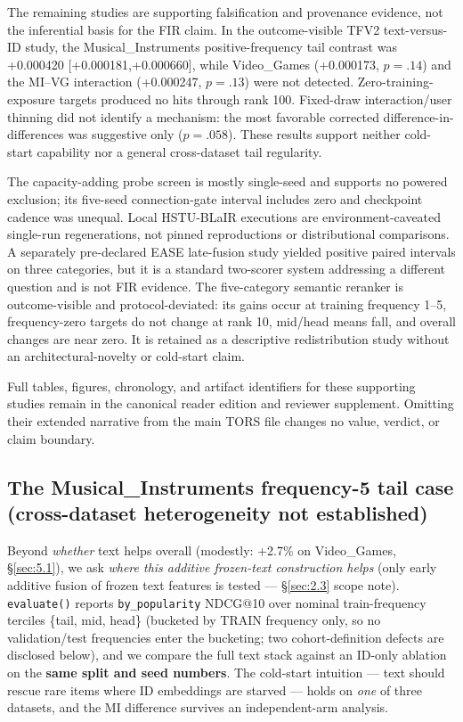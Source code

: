 The remaining studies are supporting falsification and provenance evidence, not the
inferential basis for the FIR claim.  In the outcome-visible TFV2 text-versus-ID
study, the Musical\_Instruments positive-frequency tail contrast was +0.000420
[+0.000181,+0.000660], while Video\_Games (+0.000173, $p=.14$) and the
MI--VG interaction (+0.000247, $p=.13$) were not detected.  Zero-training-exposure
targets produced no hits through rank 100.  Fixed-draw interaction/user thinning did
not identify a mechanism: the most favorable corrected difference-in-differences was
suggestive only ($p=.058$).  These results support neither cold-start capability nor a
general cross-dataset tail regularity.

The capacity-adding probe screen is mostly single-seed and supports no powered
exclusion; its five-seed connection-gate interval includes zero and checkpoint cadence
was unequal.  Local HSTU-BLaIR executions are environment-caveated single-run
regenerations, not pinned reproductions or distributional comparisons.  A separately
pre-declared EASE late-fusion study yielded positive paired intervals on three
categories, but it is a standard two-scorer system addressing a different question and
is not FIR evidence.  The five-category semantic reranker is outcome-visible and
protocol-deviated: its gains occur at training frequency 1--5, frequency-zero targets
do not change at rank 10, mid/head means fall, and overall changes are near zero.  It is
retained as a descriptive redistribution study without an architectural-novelty or
cold-start claim.

Full tables, figures, chronology, and artifact identifiers for these supporting studies
remain in the canonical reader edition and reviewer supplement.  Omitting their extended
narrative from the main TORS file changes no value, verdict, or claim boundary.
\fi

\ifextendedmaterial
\subsection{The Musical\_Instruments frequency-5 tail case (cross-dataset heterogeneity not established)}\label{sec:5.3}


Beyond \emph{whether} text helps overall (modestly: +2.7\% on Video\_Games, \S\ref{sec:5.1}), we ask \emph{where this additive frozen-text construction helps} (only early additive fusion of frozen text features is tested --- \S\ref{sec:2.3} scope note). \texttt{evaluate()} reports \texttt{by\_popularity} NDCG@10 over nominal train-frequency terciles \{tail, mid, head\} (bucketed by TRAIN frequency only, so no validation/test frequencies enter the bucketing; two cohort-definition defects are disclosed below), and we compare the full text stack against an ID-only ablation on the \textbf{same split and seed numbers}. The cold-start intuition --- text should rescue rare items where ID embeddings are starved --- holds on \emph{one} of three datasets, and the MI difference survives an independent-arm analysis.


